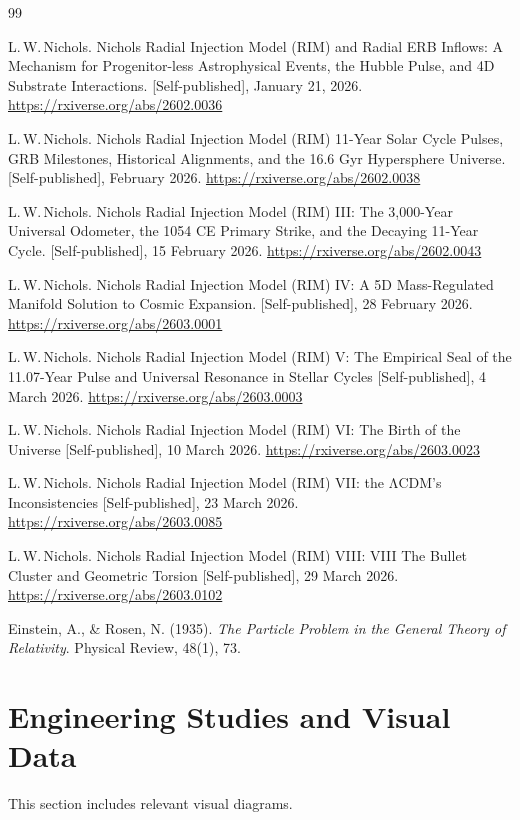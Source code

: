 \documentclass[12pt]{article}
\begin{document}
\begin{thebibliography}{99}

L.\,W.\,Nichols.
Nichols Radial Injection Model (RIM) and Radial ERB Inflows: A Mechanism for Progenitor-less Astrophysical Events, the Hubble Pulse, and 4D Substrate Interactions.
[Self-published], January 21, 2026.
\newline
\url{https://rxiverse.org/abs/2602.0036}

L.\,W.\,Nichols.
Nichols Radial Injection Model (RIM) 11-Year Solar Cycle Pulses, GRB Milestones, Historical Alignments, and the 16.6 Gyr Hypersphere Universe.
[Self-published], February 2026.
\newline
\url{https://rxiverse.org/abs/2602.0038}

L.\,W.\,Nichols.
Nichols Radial Injection Model (RIM) III: The 3,000-Year Universal Odometer, the 1054 CE Primary Strike, and the Decaying 11-Year Cycle.
[Self-published], 15 February 2026.
\newline
\url{https://rxiverse.org/abs/2602.0043}

L.\,W.\,Nichols.
Nichols Radial Injection Model (RIM) IV: A 5D Mass-Regulated Manifold Solution to Cosmic Expansion.
[Self-published], 28 February 2026.
\newline
\url{https://rxiverse.org/abs/2603.0001}

L.\,W.\,Nichols.
Nichols Radial Injection Model (RIM) V:
The Empirical Seal of the 11.07-Year Pulse
and Universal Resonance in Stellar Cycles
[Self-published], 4 March 2026.
\newline
\url{https://rxiverse.org/abs/2603.0003}

L.\,W.\,Nichols.
Nichols Radial Injection Model (RIM) VI:
The Birth of the Universe
[Self-published], 10 March 2026.
\newline
\url{https://rxiverse.org/abs/2603.0023}

L.\,W.\,Nichols.
Nichols Radial Injection Model (RIM) VII:
the ΛCDM’s Inconsistencies
[Self-published], 23 March 2026.
\newline
\url{https://rxiverse.org/abs/2603.0085}

L.\,W.\,Nichols.
Nichols Radial Injection Model (RIM) VIII:
VIII The Bullet Cluster and Geometric Torsion
[Self-published], 29 March 2026.
\newline
\url{https://rxiverse.org/abs/2603.0102}

Einstein, A., \& Rosen, N. (1935).
\textit{The Particle Problem in the General Theory of Relativity}.
Physical Review, 48(1), 73.

\end{thebibliography}

\newpage

\section{Engineering Studies and Visual Data}
This section includes relevant visual diagrams.

\end{document}
